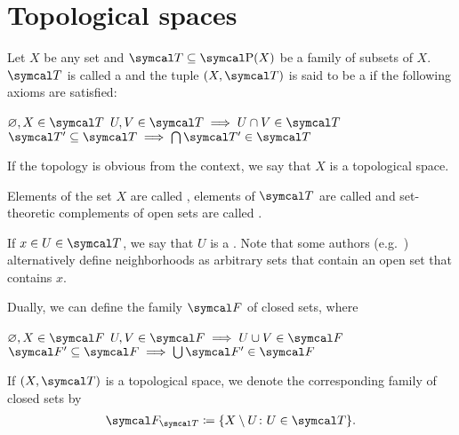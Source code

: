 \section{Topological spaces}\label{sec:topological_spaces}

\begin{definition}\label{def:topological_space}\cite[11]{Engelking1989}
  Let \( X \) be any set and \( \Cal{T} \subseteq \Power(X) \) be a family of subsets of \( X \). \( \Cal{T} \) is called a  and the tuple \( (X, \Cal{T}) \) is said to be a  if the following axioms are satisfied:
  \begin{description}
     \( \varnothing, X \in \Cal{T} \)
     \( U, V \in \Cal{T} \implies U \cap V \in \Cal{T} \)
     \( \Cal{T}' \subseteq \Cal{T} \implies \bigcap \Cal{T}' \in \Cal{T} \)
  \end{description}

  If the topology is obvious from the context, we say that \( X \) is a topological space.

  Elements of the set \( X \) are called , elements of \( \Cal{T} \) are called  and set-theoretic complements of open sets are called .

  If \( x \in U \in \Cal{T} \), we say that \( U \) is a . Note that some authors (e.g.~\cite[38]{Kelley1955}) alternatively define neighborhoods as arbitrary sets that contain an open set that contains \( x \).

  Dually, we can define the family \( \Cal{F} \) of closed sets, where
  \begin{description}
     \( \varnothing, X \in \Cal{F} \)
     \( U, V \in \Cal{F} \implies U \cup V \in \Cal{F} \)
     \( \Cal{F}' \subseteq \Cal{F} \implies \bigcup \Cal{F}' \in \Cal{F} \)
  \end{description}

  If \( (X, \Cal{T}) \) is a topological space, we denote the corresponding family of closed sets by
  \begin{align*}
    \Cal{F}_{\Cal{T}} \coloneqq \{ X \setminus U \colon U \in \Cal{T} \}.
  \end{align*}
\end{definition}

